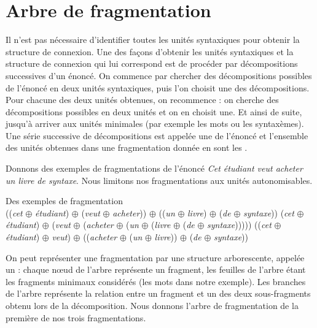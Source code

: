 \section{Arbre de fragmentation}\label{sec:3.2.21}

Il n’est pas nécessaire d’identifier toutes les unités syntaxiques pour obtenir la structure de connexion. Une des façons d’obtenir les unités syntaxiques et la structure de connexion qui lui correspond est de procéder par décompositions successives d’un énoncé. On commence par chercher des décompositions possibles de l’énoncé en deux unités syntaxiques, puis l’on choisit une des décompositions. Pour chacune des deux unités obtenues, on recommence : on cherche des décompositions possibles en deux unités et on en choisit une. Et ainsi de suite, jusqu’à arriver aux unités minimales (par exemple les mots ou les syntaxèmes). Une série successive de décompositions est appelée une  de l’énoncé et l’ensemble des unités obtenues dans une fragmentation donnée en sont les .

Donnons des exemples de fragmentations de l’énoncé \textit{Cet étudiant veut acheter un livre de syntaxe}. Nous limitons nos fragmentations aux unités autonomisables.

\ea Des exemples de fragmentation\\
\ea ((\textit{cet} ${\oplus}$ \textit{étudiant}) ${\oplus}$ (\textit{veut} ${\oplus}$ \textit{acheter})) ${\oplus}$ ((\textit{un} ${\oplus}$ \textit{livre}) ${\oplus}$ (\textit{de} ${\oplus}$ \textit{syntaxe}))\label{ex:fragmentation:1}
\ex (\textit{cet} ${\oplus}$ \textit{étudiant}) ${\oplus}$ (\textit{veut} ${\oplus}$ (\textit{acheter} ${\oplus}$ (\textit{un} ${\oplus}$  (\textit{livre} ${\oplus}$ (\textit{de} ${\oplus}$ \textit{syntaxe})))))
\ex ((\textit{cet} ${\oplus}$ \textit{étudiant}) ${\oplus}$  \textit{veut}) ${\oplus}$ ((\textit{acheter} ${\oplus}$ (\textit{un} ${\oplus}$ \textit{livre})) ${\oplus}$ (\textit{de} ${\oplus}$ \textit{syntaxe}))
\z
\z

On peut représenter une fragmentation par une structure arborescente, appelée un  : chaque nœud de l’arbre représente un fragment, les feuilles de l’arbre étant les fragments minimaux considérés (les mots dans notre exemple). Les branches de l’arbre représente la relation entre un fragment et un des deux sous-fragments obtenu lors de la décomposition. Nous donnons l’arbre de fragmentation de la première de nos trois fragmentations.

